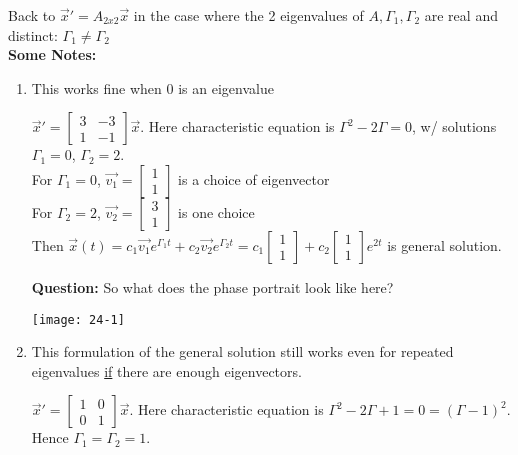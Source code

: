 Back to $\vec{x}' = A_{2x2} \vec{x}$ in the case where the 2 eigenvalues of $A, \Gamma_1, \Gamma_2$ are real and distinct: $\Gamma_1 \neq \Gamma_2$\\
\textbf{Some Notes: }
\begin{enumerate}[label=\protect\circled{\arabic*}]
	\item This works fine when 0 is an eigenvalue
	\begin{example-N}
		$\vec{x}' = \begin{bmatrix}
			3 & -3\\
			1 & -1
		\end{bmatrix} \vec{x}$. Here characteristic equation is $\Gamma^2 - 2\Gamma = 0$, w/ solutions $\Gamma_1 = 0$, $\Gamma_2 = 2$.\\
		For $\Gamma_1 = 0$, $\vec{v_1} = \begin{bmatrix}
			1\\1
		\end{bmatrix}$ is a choice of eigenvector\\
		For $\Gamma_2 = 2$, $\vec{v_2} = \begin{bmatrix}
			3\\1
		\end{bmatrix}$ is one choice\\
		Then $\vec{x}(t) = c_1\vec{v_1}e^{\Gamma_1 t} + c_2\vec{v_2}e^{\Gamma_2 t} = \boxed{c_1 \begin{bmatrix}
			1\\1
		\end{bmatrix} + c_2 \begin{bmatrix}
			1\\1
		\end{bmatrix} e^{2t}}$ is general solution.
	\end{example-N}
	\textbf{Question:} So what does the phase portrait look like here?
	\begin{center}
		\texttt{[image: 24-1]}
	\end{center}
	\item This formulation of the general solution still works even for repeated eigenvalues \underline{if}	 there are enough eigenvectors.
	\begin{example-N}
		$\vec{x}' = \begin{bmatrix}
			1 & 0 \\ 0 & 1
		\end{bmatrix} \vec{x}$. Here characteristic equation is $\Gamma^2 - 2\Gamma + 1 = 0 = (\Gamma - 1)^2$. Hence $\Gamma_1 = \Gamma_2 = 1$.\\

\end{example-N}
\end{enumerate}
